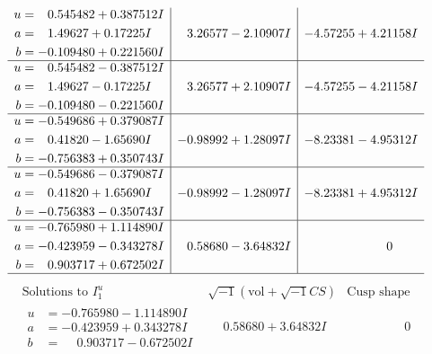 \documentclass[1p]{elsarticle_modified}
\theoremstyle{definition}
\newcommand{\I}{\sqrt{-1}}
\begin{document}
$$\begin{array}{c|c|c}
\begin{aligned}
u &= \phantom{-}0.545482 + 0.387512 I \\
a &= \phantom{-}1.49627 + 0.17225 I \\
b &= -0.109480 + 0.221560 I\end{aligned}
 & \phantom{-}3.26577 - 2.10907 I & -4.57255 + 4.21158 I \\ \hline\begin{aligned}
u &= \phantom{-}0.545482 - 0.387512 I \\
a &= \phantom{-}1.49627 - 0.17225 I \\
b &= -0.109480 - 0.221560 I\end{aligned}
 & \phantom{-}3.26577 + 2.10907 I & -4.57255 - 4.21158 I \\ \hline\begin{aligned}
u &= -0.549686 + 0.379087 I \\
a &= \phantom{-}0.41820 - 1.65690 I \\
b &= -0.756383 + 0.350743 I\end{aligned}
 & -0.98992 + 1.28097 I & -8.23381 - 4.95312 I \\ \hline\begin{aligned}
u &= -0.549686 - 0.379087 I \\
a &= \phantom{-}0.41820 + 1.65690 I \\
b &= -0.756383 - 0.350743 I\end{aligned}
 & -0.98992 - 1.28097 I & -8.23381 + 4.95312 I \\ \hline\begin{aligned}
u &= -0.765980 + 1.114890 I \\
a &= -0.423959 - 0.343278 I \\
b &= \phantom{-}0.903717 + 0.672502 I\end{aligned}
 & \phantom{-}0.58680 - 3.64832 I & \phantom{-0.000000 } 0\\
 \hline 
 \end{array}$$\newpage$$\begin{array}{c|c|c}  
\text{Solutions to }I^u_{1}& \I (\text{vol} + \sqrt{-1}CS) & \text{Cusp shape}\\
 \hline 
\begin{aligned}
u &= -0.765980 - 1.114890 I \\
a &= -0.423959 + 0.343278 I \\
b &= \phantom{-}0.903717 - 0.672502 I\end{aligned}
 & \phantom{-}0.58680 + 3.64832 I & \phantom{-0.000000 } 0 \\ \hline\begin{aligned}

\end{aligned}
\end{array}$$
\end{document}

